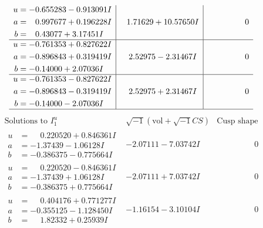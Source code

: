 \documentclass[1p]{elsarticle_modified}
\theoremstyle{definition}
\newcommand{\I}{\sqrt{-1}}
\begin{document}
$$\begin{array}{c|c|c}
\begin{aligned}
u &= -0.655283 - 0.913091 I \\
a &= \phantom{-}0.997677 + 0.196228 I \\
b &= \phantom{-}0.43077 + 3.17451 I\end{aligned}
 & \phantom{-}1.71629 + 10.57650 I & \phantom{-0.000000 } 0 \\ \hline\begin{aligned}
u &= -0.761353 + 0.827622 I \\
a &= -0.896843 + 0.319419 I \\
b &= -0.14000 + 2.07036 I\end{aligned}
 & \phantom{-}2.52975 - 2.31467 I & \phantom{-0.000000 } 0 \\ \hline\begin{aligned}
u &= -0.761353 - 0.827622 I \\
a &= -0.896843 - 0.319419 I \\
b &= -0.14000 - 2.07036 I\end{aligned}
 & \phantom{-}2.52975 + 2.31467 I & \phantom{-0.000000 } 0\\
 \hline 
 \end{array}$$\newpage$$\begin{array}{c|c|c}  
\text{Solutions to }I^u_{1}& \I (\text{vol} + \sqrt{-1}CS) & \text{Cusp shape}\\
 \hline 
\begin{aligned}
u &= \phantom{-}0.220520 + 0.846361 I \\
a &= -1.37439 - 1.06128 I \\
b &= -0.386375 - 0.775664 I\end{aligned}
 & -2.07111 - 7.03742 I & \phantom{-0.000000 } 0 \\ \hline\begin{aligned}
u &= \phantom{-}0.220520 - 0.846361 I \\
a &= -1.37439 + 1.06128 I \\
b &= -0.386375 + 0.775664 I\end{aligned}
 & -2.07111 + 7.03742 I & \phantom{-0.000000 } 0 \\ \hline\begin{aligned}
u &= \phantom{-}0.404176 + 0.771277 I \\
a &= -0.355125 - 1.128450 I \\
b &= \phantom{-}1.82332 + 0.25939 I\end{aligned}
 & -1.16154 - 3.10104 I & \phantom{-0.000000 } 0 \\ \hline\begin{aligned}

\end{aligned}
\end{array}$$
\end{document}
